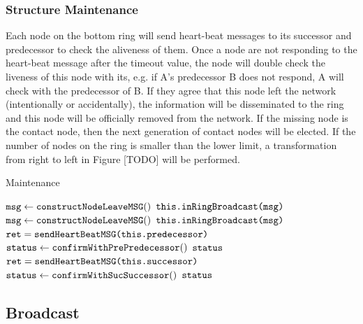 \subsubsection{Structure Maintenance} \label{maintain}

Each node on the bottom ring will send heart-beat messages to its successor and predecessor to check the aliveness of them. Once a node are not responding to the heart-beat message after the timeout value, the node will double check the liveness of this node with its, e.g. if A's predecessor B does not respond, A will check with the predecessor of B. If they agree that this node left the network (intentionally or accidentally), the information will be disseminated to the ring and this node will be officially removed from the network. If the missing node is the contact node, then the next generation of contact nodes will be elected. If the number of nodes on the ring is smaller than the lower limit, a transformation from right to left in Figure [TODO] will be performed.

\begin{algorithm}
	\caption{Maintenance}\label{euclid}
	\begin{algorithmic}[1]
		\State $\texttt{msg} \gets \texttt{constructNodeLeaveMSG}()$
		\State $\texttt{this.inRingBroadcast(msg)}$
		\EndIf
		\State $\texttt{msg} \gets \texttt{constructNodeLeaveMSG}()$
		\State $\texttt{this.inRingBroadcast(msg)}$
		\EndIf
		\EndFunction
		\\
		\State $\texttt{ret} = \texttt{sendHeartBeatMSG(this.predecessor)}$
		\State $\texttt{status} \gets \texttt{confirmWithPrePredecessor}()$
		\State \Return $\texttt{status}$
		\EndIf
		\EndFunction
		\\
		\State $\texttt{ret} = \texttt{sendHeartBeatMSG(this.successor)}$
		\State $\texttt{status} \gets \texttt{confirmWithSucSuccessor}()$
		\State \Return $\texttt{status}$
		\EndIf
		\EndFunction
	\end{algorithmic}
\end{algorithm}

\subsection{Broadcast} \label{broadcast}

